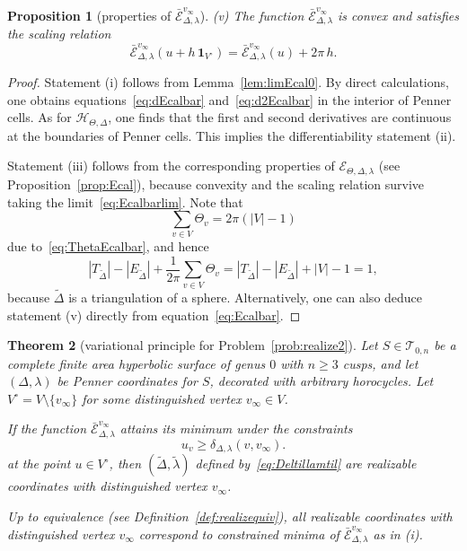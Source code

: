 \documentclass[a4paper, 11pt]{article}
\newcommand{\Teich}{\mathcal{T}}
\newcommand{\Deltil}{\widetilde{\Delta}}
\newcommand{\lamtil}{\tilde{\lambda}}
\newcommand{\Hcal}{\mathcal{H}}
\newcommand{\Ecal}{\mathcal{E}}
\newcommand{\Ecalbar}{\bar{\Ecal}}
\newcommand{\Vo}{V^{\circ}}
\theoremstyle{plain}
\newtheorem{theorem}{Theorem}[section]
\newtheorem{proposition}[theorem]{Proposition}
\theoremstyle{definition}
\begin{document}
\begin{proposition}[properties of $\Ecalbar^{v_{\infty}}_{\Delta,\lambda}$]
  (v) The function $\Ecalbar^{v_{\infty}}_{\Delta,\lambda}$ is
  convex and satisfies the scaling relation
  \begin{equation}
    \label{eq:Ecalbarscale}
    \Ecalbar^{v_{\infty}}_{\Delta,\lambda}(u+h\,\mathbf{1}_{\Vo})
    =\Ecalbar^{v_{\infty}}_{\Delta,\lambda}(u)+2\pi\,h.
  \end{equation}
\end{proposition}

\begin{proof}
  Statement (i) follows from Lemma~\ref{lem:limEcal0}. By direct
  calculations, one obtains equations~\eqref{eq:dEcalbar}
  and~\eqref{eq:d2Ecalbar} in the interior of Penner cells. As for
  $\Hcal_{\Theta,\Delta}$, one finds that the first and second
  derivatives are continuous at the boundaries of Penner cells. This
  implies the differentiability statement (ii). 

  Statement (iii) follows from the corresponding properties of
  $\Ecal_{\Theta,\Delta,\lambda}$ (see Proposition~\ref{prop:Ecal}),
  because convexity and the scaling relation survive taking the
  limit~\eqref{eq:Ecalbarlim}. Note that
  \begin{equation*}
    \sum_{v\in V}\Theta_{v}=2\pi(|V|-1) 
  \end{equation*}
  due to~\eqref{eq:ThetaEcalbar}, and hence 
  \begin{equation*}
    |T_{\Deltil}|-|E_{\Deltil}|+\frac{1}{2\pi}\sum_{v\in V}\Theta_{v} 
    = |T_{\Deltil}|-|E_{\Deltil}|+|V|-1=1,
  \end{equation*}
  because $\Deltil$ is a triangulation of a sphere. Alternatively, one
  can also deduce statement (v) directly from
  equation~\eqref{eq:Ecalbar}.
\end{proof}

\begin{theorem}[variational principle for Problem~\ref{prob:realize2}]
  \label{thm:variational}
  Let $S\in\Teich_{0,n}$ be a complete finite area hyperbolic surface
  of genus $0$ with $n\geq 3$ cusps, and let $(\Delta,\lambda)$ be
  Penner coordinates for $S$, decorated with arbitrary horocycles.
  Let $\Vo=V\setminus\{v_{\infty}\}$ for some distinguished vertex
  $v_{\infty}\in V$. 
  \begin{compactenum}[(i)]
  \item If the function $\Ecalbar^{v_{\infty}}_{\Delta,\lambda}$ attains
    its minimum under the constraints
    \begin{equation}
      \label{eq:boxconstraint}
      u_{v} \geq \delta_{\Delta,\lambda}(v,v_{\infty}).
    \end{equation}
    at the point $u\in\Vo$, then $(\Deltil,\lamtil)$ defined
    by~\eqref{eq:Deltillamtil} are realizable coordinates with
    distinguished vertex $v_{\infty}$.
  \item Up to equivalence (see Definition~\ref{def:realizequiv}), all
    realizable coordinates with distinguished vertex $v_{\infty}$
    correspond to constrained minima of
    $\Ecalbar^{v_{\infty}}_{\Delta,\lambda}$ as in (i).
  \end{compactenum}
\end{theorem}
\end{document}
